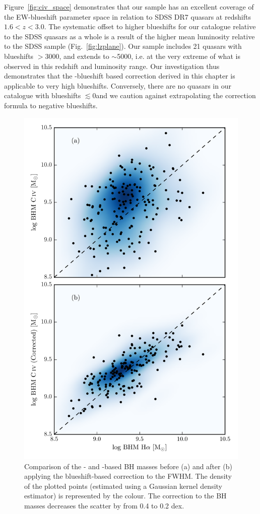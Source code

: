 Figure~\ref{fig:civ_space} demonstrates that our sample has an excellent coverage of the EW-blueshift parameter space in relation to SDSS DR7 quasars at redshifts $1.6 < z < 3.0$. 
The systematic offset to higher  blueshifts for our catalogue relative to the SDSS quasars as a whole is a result of the higher mean luminosity relative to the SDSS sample (Fig.~\ref{fig:lzplane}).
Our sample includes 21 quasars with  blueshifts $>$3000\kms, and extends to $\sim$5000\kms, i.e. at the very extreme of what is observed in this redshift and luminosity range. 
Our investigation thus demonstrates that the -blueshift based correction derived in this chapter is applicable to very high blueshifts. 
Conversely, there are no quasars in our catalogue with  blueshifts $\lesssim$0\kms and we caution against extrapolating the correction formula to negative blueshifts. 

\begin{figure}
    \centering 
    \includegraphics[width=0.8\columnwidth]{figures/chapter03/bhm_comparison.pdf} 
    \caption{Comparison of the - and \hans-based BH masses before (a) and after (b) applying the  blueshift-based correction to the  FWHM. The density of the plotted points (estimated using a Gaussian kernel density estimator) is represented by the colour. The correction to the  BH masses decreases the scatter by from 0.4 to 0.2 dex. }   
    \label{fig:bhm_comparison}
\end{figure}

